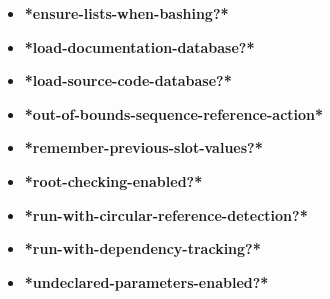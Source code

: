 \documentclass [11pt]{book}
\begin{document}
\begin{itemize}
\item {}
\label{prim:*ensure-lists-when-bashing?*}
\textbf{*ensure-lists-when-bashing?*}





\item {}
\label{prim:*load-documentation-database?*}
\textbf{*load-documentation-database?*}





\item {}
\label{prim:*load-source-code-database?*}
\textbf{*load-source-code-database?*}





\item {}
\label{prim:*out-of-bounds-sequence-reference-action*}
\textbf{*out-of-bounds-sequence-reference-action*}





\item {}
\label{prim:*remember-previous-slot-values?*}
\textbf{*remember-previous-slot-values?*}





\item {}
\label{prim:*root-checking-enabled?*}
\textbf{*root-checking-enabled?*}





\item {}
\label{prim:*run-with-circular-reference-detection?*}
\textbf{*run-with-circular-reference-detection?*}





\item {}
\label{prim:*run-with-dependency-tracking?*}
\textbf{*run-with-dependency-tracking?*}





\item {}
\label{prim:*undeclared-parameters-enabled?*}
\textbf{*undeclared-parameters-enabled?*}






\end{itemize}
\end{document}
